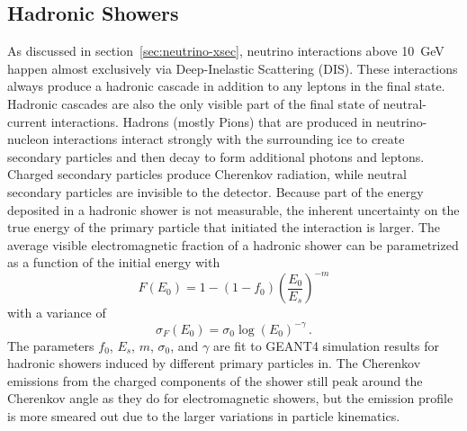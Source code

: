 \subsection{Hadronic Showers}
\label{sec:had-showers}
As discussed in section~\ref{sec:neutrino-xsec}, neutrino interactions above 10~GeV happen almost exclusively via Deep-Inelastic Scattering (DIS). These interactions always produce a hadronic cascade in addition to any leptons in the final state. Hadronic cascades are also the only visible part of the final state of neutral-current interactions. Hadrons (mostly Pions) that are produced in neutrino-nucleon interactions interact strongly with the surrounding ice to create secondary particles and then decay to form additional photons and leptons. Charged secondary particles produce Cherenkov radiation, while neutral secondary particles are invisible to the detector. Because part of the energy deposited in a hadronic shower is not measurable, the inherent uncertainty on the true energy of the primary particle that initiated the interaction is larger. The average visible electromagnetic fraction of a hadronic shower can be parametrized\cite{RADEL2013102} as a function of the initial energy with
\begin{equation}
    F(E_0) = 1 - (1-f_0)\left(\frac{E_0}{E_s}\right)^{-m}
\end{equation}
with a variance of
\begin{equation}
    \sigma_F(E_0) = \sigma_0 \log(E_0)^{-\gamma}\,.
\end{equation}
The parameters $f_0$, $E_s$, $m$, $\sigma_0$, and $\gamma$ are fit to GEANT4 simulation results for hadronic showers induced by different primary particles in\cite{RADEL2013102}.
The Cherenkov emissions from the charged components of the shower still peak around the Cherenkov angle as they do for electromagnetic showers, but the emission profile is more smeared out due to the larger variations in particle kinematics.
